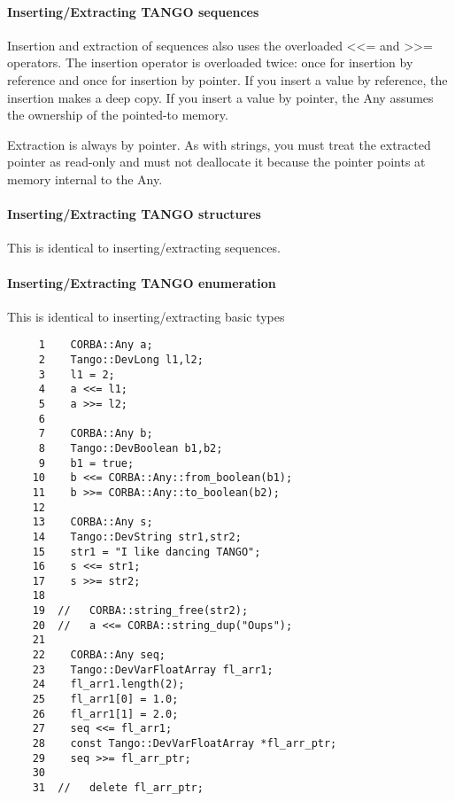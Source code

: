 \paragraph{Inserting/Extracting TANGO sequences}

Insertion and extraction of sequences also uses the
overloaded <\textcompwordmark{}<= and >\textcompwordmark{}>= operators.
The insertion operator is overloaded twice: once for insertion by
reference and once for insertion by pointer. If you insert a value
by reference, the insertion makes a deep copy. If you insert a value
by pointer, the Any assumes the ownership of the pointed-to
memory. 

Extraction is always by pointer. As with strings, you must treat the
extracted pointer as read-only and must not deallocate it because
the pointer points at memory internal to the Any.


\paragraph{Inserting/Extracting TANGO structures}

This is identical to inserting/extracting sequences.


\paragraph{Inserting/Extracting TANGO enumeration}

This is identical to inserting/extracting basic types


\begin{verbatim}
     1    CORBA::Any a;
     2    Tango::DevLong l1,l2;
     3    l1 = 2;
     4    a <<= l1;
     5    a >>= l2;
     6  
     7    CORBA::Any b;
     8    Tango::DevBoolean b1,b2;
     9    b1 = true;
    10    b <<= CORBA::Any::from_boolean(b1);
    11    b >>= CORBA::Any::to_boolean(b2);
    12  
    13    CORBA::Any s;
    14    Tango::DevString str1,str2;
    15    str1 = "I like dancing TANGO";
    16    s <<= str1;
    17    s >>= str2;
    18  
    19  //   CORBA::string_free(str2);
    20  //   a <<= CORBA::string_dup("Oups");
    21  
    22    CORBA::Any seq;
    23    Tango::DevVarFloatArray fl_arr1;
    24    fl_arr1.length(2);
    25    fl_arr1[0] = 1.0;
    26    fl_arr1[1] = 2.0;
    27    seq <<= fl_arr1;
    28    const Tango::DevVarFloatArray *fl_arr_ptr;
    29    seq >>= fl_arr_ptr;
    30  
    31  //   delete fl_arr_ptr;
\end{verbatim}


